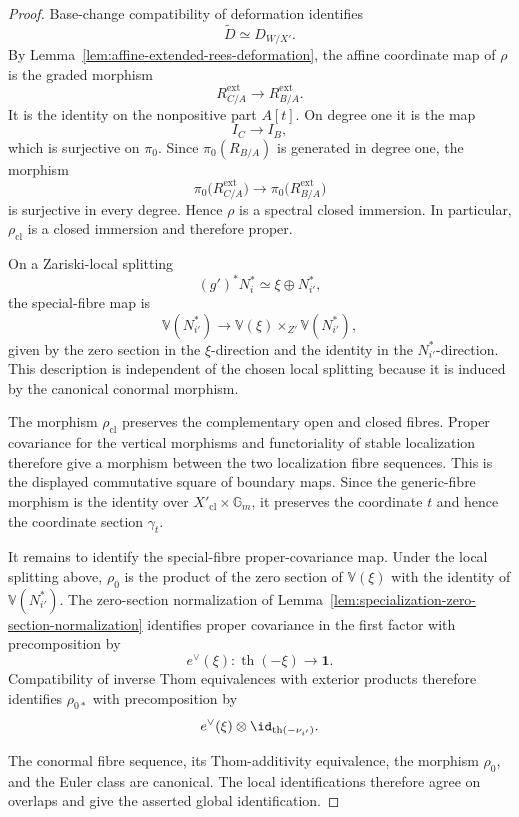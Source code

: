 \begin{proof}
Base-change compatibility of deformation identifies
\[
    \widetilde D
    \simeq
    D_{W/X'}.
\]
By
Lemma~\ref{lem:affine-extended-rees-deformation}, the affine coordinate map
of \(\rho\) is the graded morphism
\[
    R^{\mathrm{ext}}_{C/A}
    \longrightarrow
    R^{\mathrm{ext}}_{B/A}.
\]
It is the identity on the nonpositive part \(A[t]\).  On degree one it
is the map
\[
    I_C\longrightarrow I_B,
\]
which is surjective on \(\pi_0\).  Since
\(\pi_0(R_{B/A})\) is generated in degree one, the morphism
\[
    \pi_0
    \bigl(
      R^{\mathrm{ext}}_{C/A}
    \bigr)
    \longrightarrow
    \pi_0
    \bigl(
      R^{\mathrm{ext}}_{B/A}
    \bigr)
\]
is surjective in every degree.  Hence \(\rho\) is a spectral closed
immersion.  In particular, \(\rho_{\mathrm{cl}}\) is a closed immersion and
therefore proper.

On a Zariski-local splitting
\[
    (g')^*N_i^*
    \simeq
    \xi\oplus N_{i'}^*,
\]
the special-fibre map is
\[
    \mathbb V(N_{i'}^*)
    \longrightarrow
    \mathbb V(\xi)
    \times_{Z'}
    \mathbb V(N_{i'}^*),
\]
given by the zero section in the \(\xi\)-direction and the identity in the
\(N_{i'}^*\)-direction.  This description is independent of the chosen
local splitting because it is induced by the canonical conormal morphism.

The morphism \(\rho_{\mathrm{cl}}\) preserves the complementary open and
closed fibres.  Proper covariance for the vertical morphisms and
functoriality of stable localization therefore give a morphism between the
two localization fibre sequences.  This is the displayed commutative
square of boundary maps.  Since the generic-fibre morphism is the identity
over \(X'_{\mathrm{cl}}\times\mathbb G_m\), it preserves the coordinate
\(t\) and hence the coordinate section \(\gamma_t\).

It remains to identify the special-fibre proper-covariance map.  Under the
local splitting above, \(\rho_0\) is the product of the zero section of
\(\mathbb V(\xi)\) with the identity of
\(\mathbb V(N_{i'}^*)\).  The zero-section normalization of
Lemma~\ref{lem:specialization-zero-section-normalization}
identifies proper covariance in the first factor with precomposition by
\[
    e^\vee(\xi):
    \operatorname{th}(-\xi)
    \longrightarrow
    \mathbf1.
\]
Compatibility of inverse Thom equivalences with exterior products
therefore identifies \(\rho_{0*}\) with precomposition by
\[
    e^\vee(\xi)
    \otimes
    \id_{\operatorname{th}(-\nu_{i'})}.
\]

The conormal fibre sequence, its Thom-additivity equivalence, the morphism
\(\rho_0\), and the Euler class are canonical.  The local identifications
therefore agree on overlaps and give the asserted global identification.
\end{proof}


